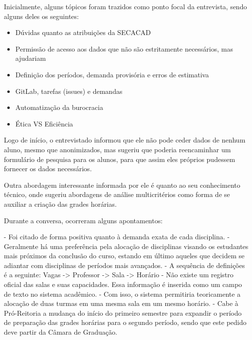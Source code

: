         Inicialmente, alguns tópicos foram trazidos como ponto focal da entrevista, sendo alguns deles os seguintes:

        \begin{itemize}
            \item Dúvidas quanto as atribuições da SECACAD
            \item Permissão de acesso aos dados que não são estritamente necessários, mas ajudariam
            \item Definição dos períodos, demanda provisória e erros de estimativa
            \item GitLab, tarefas (issues) e demandas
            \item Automatização da burocracia
            \item Ética VS Eficiência
        \end{itemize}


        Logo de início, o entrevistado informou que ele não pode ceder dados de nenhum aluno, mesmo que anonimizados, mas sugeriu que poderia reencaminhar um formulário de pesquisa para os alunos, para que assim eles próprios pudessem fornecer os dados necessários.

        Outra abordagem interessante informada por ele é quanto ao seu conhecimento técnico, onde sugeriu abordagens de análise multicritérios como forma de se auxiliar a criação das grades horárias.

        Durante a conversa, ocorreram alguns apontamentos:

        - Foi citado de forma positiva quanto à demanda exata de cada disciplina.
        - Geralmente há uma preferência pela alocação de disciplinas visando os estudantes mais próximos da conclusão do curso, estando em último aqueles que decidem se adiantar com disciplinas de períodos mais avançados.
        - A sequência de definições é a seguinte: Vagas -> Professor -> Sala -> Horário
        - Não existe um registro oficial das salas e suas capacidades. Essa informação é inserida como um campo de texto no sistema acadêmico.
        - Com isso, o sistema permitiria teoricamente a alocação de duas turmas em uma mesma sala em um mesmo horário.
        - Cabe à Pró-Reitoria a mudança do início do primeiro semestre para expandir o período de preparação das grades horárias para o segundo período, sendo que este pedido deve partir da Câmara de Graduação.

